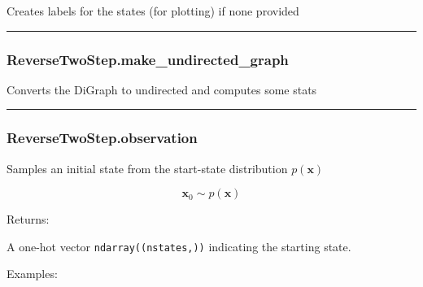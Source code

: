 \begin{Shaded}
\begin{Highlighting}[]
\NormalTok{)}
\end{Highlighting}
\end{Shaded}

Creates labels for the states (for plotting) if none provided

\begin{center}\rule{0.5\linewidth}{\linethickness}\end{center}

\subsubsection{ReverseTwoStep.make\_undirected\_graph}\label{reversetwostep.make_undirected_graph}

\begin{Shaded}
\begin{Highlighting}[]
\NormalTok{)}
\end{Highlighting}
\end{Shaded}

Converts the DiGraph to undirected and computes some stats

\begin{center}\rule{0.5\linewidth}{\linethickness}\end{center}

\subsubsection{ReverseTwoStep.observation}\label{reversetwostep.observation}

\begin{Shaded}
\begin{Highlighting}[]
\NormalTok{)}
\end{Highlighting}
\end{Shaded}

Samples an initial state from the start-state distribution
\(p(\mathbf x)\)

\[
\mathbf x_0 \sim p(\mathbf x)
\]

Returns:

A one-hot vector \texttt{ndarray((nstates,))} indicating the starting
state.

Examples:

